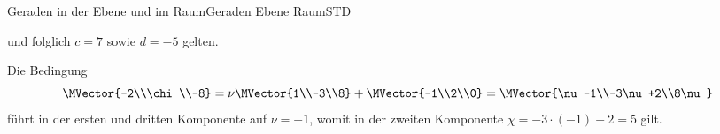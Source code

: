 \begin{MXContent}{Geraden in der Ebene und im Raum}{Geraden Ebene Raum}{STD}
\begin{MExercise}
\begin{MHint}{\iSolution}
\begin{MExerciseItems}
{\[\]
und folglich $c=7$ sowie $d=-5$ gelten.
}
\item{
Die Bedingung 
\[
 \MVector{-2\\\chi\\-8} = \nu\MVector{1\\-3\\8}+\MVector{-1\\2\\0} = \MVector{\nu-1\\-3\nu+2\\8\nu}
\]
führt in der ersten und dritten Komponente auf $\nu=-1$, womit in der zweiten Komponente $\chi=-3\cdot(-1)+2=5$ gilt.
}
\end{MExerciseItems}
\end{MHint}

\end{MExercise}

\end{MXContent}


